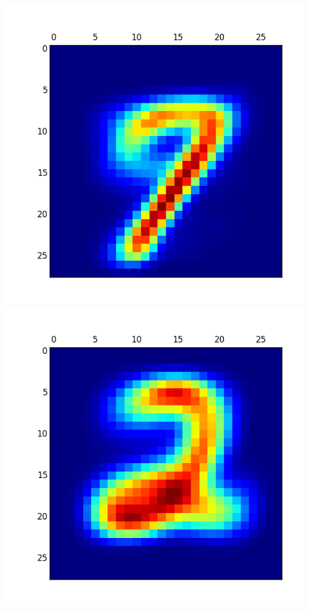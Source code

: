 \documentclass[11pt]{article}
\begin{document}
\begin{itemize}
\includegraphics[scale = 0.5]{32.png}
\includegraphics[scale = 0.5]{33.png}


\end{itemize}
\end{document}
